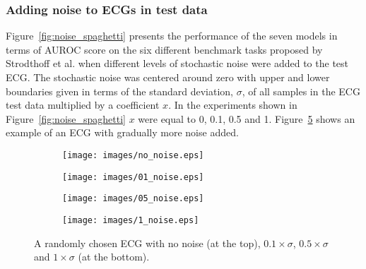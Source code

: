 \subsubsection{Adding noise to ECGs in test data}
Figure~\ref{fig:noise_spaghetti} presents the performance of the seven models in terms of AUROC score on the six different benchmark tasks proposed by Strodthoff et al. when different levels of stochastic noise were added to the test ECG. The stochastic noise was centered around zero with upper and lower boundaries given in terms of the standard deviation, $\sigma$, of all samples in the ECG test data multiplied by a coefficient $x$. In the experiments shown in Figure~\ref{fig:noise_spaghetti} $x$ were equal to 0, 0.1, 0.5 and 1. Figure~\ref{fig:ecg_noise_ex} shows an example of an ECG with gradually more noise added.
\begin{figure}[hp]
 
     \begin{subfigure}[b]{0.99\textwidth}
        \centering
        \texttt{[image: images/no\_noise.eps]}
        \label{fig:nonoise}
     \end{subfigure}
     \hfill
     \begin{subfigure}[b]{0.99\textwidth}
        \centering
        \texttt{[image: images/01\_noise.eps]}
        \label{fig:01noise}
     \end{subfigure}
     \hfill
      \begin{subfigure}[b]{0.99\textwidth}
        \centering
        \texttt{[image: images/05\_noise.eps]}
        \label{fig:05noise}
     \end{subfigure}
        \hfill
      \begin{subfigure}[b]{0.99\textwidth}
        \centering
        \texttt{[image: images/1\_noise.eps]}
        \label{fig:1noise}
     \end{subfigure}
    \caption{A randomly chosen ECG with no noise (at the top), $0.1\times\sigma$, $0.5\times\sigma$ and $1\times\sigma$ (at the bottom).
    }
    \label{fig:ecg_noise_ex}
\end{figure}


